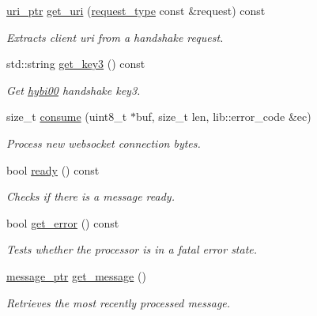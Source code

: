 \begin{DoxyCompactItemize}
\hyperlink{namespacewebsocketpp_aae370ea5ac83a8ece7712cb39fc23f5b}{uri\+\_\+ptr} \hyperlink{classwebsocketpp_1_1processor_1_1hybi00_a10d804be20e3e5fb04fea7b7ea259758}{get\+\_\+uri} (\hyperlink{classwebsocketpp_1_1processor_1_1hybi00_a9992ac4efa9cc4d46ee0e9e1060cf860}{request\+\_\+type} const \&request) const 
\begin{DoxyCompactList}\small\item\em Extracts client uri from a handshake request. \end{DoxyCompactList}\item 
std\+::string \hyperlink{classwebsocketpp_1_1processor_1_1hybi00_a8fd85b472ff816d0b7c54759abeff640}{get\+\_\+key3} () const 
\begin{DoxyCompactList}\small\item\em Get \hyperlink{classwebsocketpp_1_1processor_1_1hybi00}{hybi00} handshake key3. \end{DoxyCompactList}\item 
size\+\_\+t \hyperlink{classwebsocketpp_1_1processor_1_1hybi00_a8065338a7a9c760a92ce24d736a3dff2}{consume} (uint8\+\_\+t $\ast$buf, size\+\_\+t len, lib\+::error\+\_\+code \&ec)
\begin{DoxyCompactList}\small\item\em Process new websocket connection bytes. \end{DoxyCompactList}\item 
bool \hyperlink{classwebsocketpp_1_1processor_1_1hybi00_abc60cb8570c5adfa9913de7b91126f8a}{ready} () const 
\begin{DoxyCompactList}\small\item\em Checks if there is a message ready. \end{DoxyCompactList}\item 
bool \hyperlink{classwebsocketpp_1_1processor_1_1hybi00_ae9d812c2b37b596b687ecd4415a8f4d9}{get\+\_\+error} () const 
\begin{DoxyCompactList}\small\item\em Tests whether the processor is in a fatal error state. \end{DoxyCompactList}\item 
\hyperlink{classwebsocketpp_1_1processor_1_1hybi00_a300a0810d09570108e3dd747d97a8257}{message\+\_\+ptr} \hyperlink{classwebsocketpp_1_1processor_1_1hybi00_af5f3b4bec38c586e31c0574b6c3f56b8}{get\+\_\+message} ()
\begin{DoxyCompactList}\small\item\em Retrieves the most recently processed message. \end{DoxyCompactList}\item 

\end{DoxyCompactItemize}

